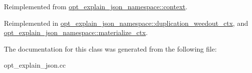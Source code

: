 Reimplemented from \mbox{\hyperlink{classopt__explain__json__namespace_1_1context_ad2ea8a178f9b0faacf2d76a43447048f}{opt\+\_\+explain\+\_\+json\+\_\+namespace\+::context}}.



Reimplemented in \mbox{\hyperlink{classopt__explain__json__namespace_1_1duplication__weedout__ctx_abddc44a12584e636196cbceec61862dd}{opt\+\_\+explain\+\_\+json\+\_\+namespace\+::duplication\+\_\+weedout\+\_\+ctx}}, and \mbox{\hyperlink{classopt__explain__json__namespace_1_1materialize__ctx_a88d221b18598fa4bcdb77cafabb8e7be}{opt\+\_\+explain\+\_\+json\+\_\+namespace\+::materialize\+\_\+ctx}}.



The documentation for this class was generated from the following file\+:\begin{DoxyCompactItemize}
\item 
opt\+\_\+explain\+\_\+json.\+cc\end{DoxyCompactItemize}
